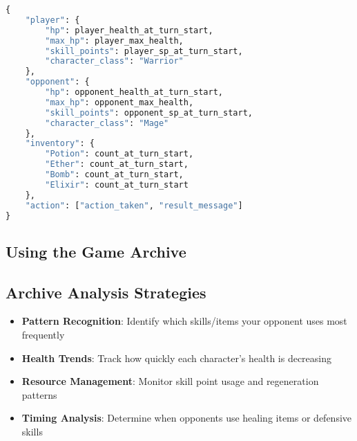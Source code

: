 \documentclass[12pt]{article}
\begin{document}
\begin{lstlisting}[language=Python, caption=Game Archive Entry Structure]
{
    "player": {
        "hp": player_health_at_turn_start,
        "max_hp": player_max_health,
        "skill_points": player_sp_at_turn_start,
        "character_class": "Warrior"
    },
    "opponent": {
        "hp": opponent_health_at_turn_start,
        "max_hp": opponent_max_health,
        "skill_points": opponent_sp_at_turn_start,
        "character_class": "Mage"
    },
    "inventory": {
        "Potion": count_at_turn_start,
        "Ether": count_at_turn_start,
        "Bomb": count_at_turn_start,
        "Elixir": count_at_turn_start
    },
    "action": ["action_taken", "result_message"]
}
\end{lstlisting}

 \subsection{Using the Game Archive}
% 
%         
%         
%     

\subsection{Archive Analysis Strategies}
\begin{itemize}
    \item \textbf{Pattern Recognition}: Identify which skills/items your opponent uses most frequently
    \item \textbf{Health Trends}: Track how quickly each character's health is decreasing
    \item \textbf{Resource Management}: Monitor skill point usage and regeneration patterns
    \item \textbf{Timing Analysis}: Determine when opponents use healing items or defensive skills
\end{itemize}
\end{document}
